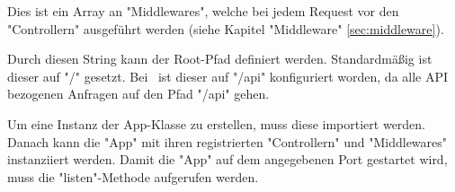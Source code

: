 
Dies ist ein Array an "Middlewares", welche bei jedem Request vor den "Controllern" ausgeführt werden (siehe Kapitel "Middleware" \ref{sec:middleware}).


Durch diesen String kann der Root-Pfad definiert werden. Standardmäßig ist dieser auf "{\ttfamily /}" gesetzt. Bei \ZELIA\ ist dieser auf "{\ttfamily /api}" konfiguriert worden, da alle API bezogenen Anfragen auf den Pfad "{\ttfamily /api}" gehen.

Um eine Instanz der App-Klasse zu erstellen, muss diese importiert werden. Danach kann die "App" mit ihren registrierten "Controllern" und "Middlewares" instanziiert werden. Damit die "App" auf dem angegebenen Port gestartet wird, muss die "listen"-Methode aufgerufen werden.

